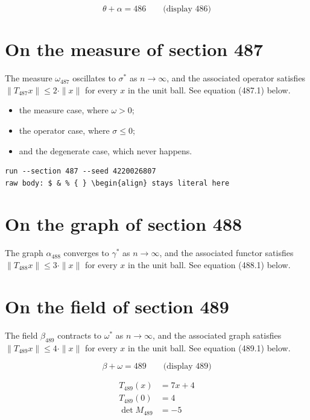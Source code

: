 \documentclass{article}
\begin{document}
$$
\theta + \alpha = 486 \qquad \text{(display 486)}
$$

\section{On the measure of section 487}
The measure $\omega_{487}$ oscillates to $\sigma^{*}$ as $n \to \infty$,
and the associated operator satisfies $\|T_{487} x\| \leq 2 \cdot \|x\|$
for every $x$ in the unit ball. See equation (487.1) below.

\begin{itemize}
  \item the measure case, where $\omega > 0$;
  \item the operator case, where $\sigma \leq 0$;
  \item and the degenerate case, which never happens.
\end{itemize}

\begin{verbatim}
run --section 487 --seed 4220026807
raw body: $ & % { } \begin{align} stays literal here
\end{verbatim}

\section{On the graph of section 488}
The graph $\alpha_{488}$ converges to $\gamma^{*}$ as $n \to \infty$,
and the associated functor satisfies $\|T_{488} x\| \leq 3 \cdot \|x\|$
for every $x$ in the unit ball. See equation (488.1) below.

\section{On the field of section 489}
The field $\beta_{489}$ contracts to $\omega^{*}$ as $n \to \infty$,
and the associated graph satisfies $\|T_{489} x\| \leq 4 \cdot \|x\|$
for every $x$ in the unit ball. See equation (489.1) below.

$$
\beta + \omega = 489 \qquad \text{(display 489)}
$$

\begin{align}
T_{489}(x) &= 7 x + 4 \\
T_{489}(0) &= 4 \\
\det M_{489} &= -5
\end{align}
\end{document}
